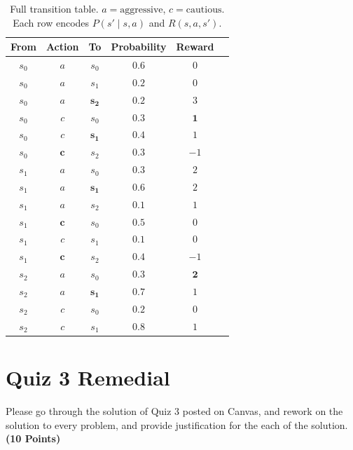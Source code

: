 \documentclass[12pt, xcolor=dvipsnames,svgnames,x11names]{article}
\begin{document}
\begin{enumerate}
\begin{table}[htpb]
\centering
\renewcommand{\arraystretch}{1.3}
\begin{tabular}{cccccc}
\hline
\textbf{From} & \textbf{Action} & \textbf{To} & \textbf{Probability} & \textbf{Reward} \\
\hline
$s_0$ & $a$ & $s_0$ & $0.6$ & $0$  \\
$s_0$ & $a$ & $s_1$ & $0.2$ & $0$  \\
$s_0$ & $a$ & $\boldsymbol{s_2}$ & $0.2$ & $3$  \\
$s_0$ & $c$ & $s_0$ & $0.3$ & $\boldsymbol{1}$  \\
$s_0$ & $c$ & $\boldsymbol{s_1}$   & $0.4$ & $1$  \\
$s_0$ & $\boldsymbol{c}$   & $s_2$ & $0.3$ & $-1$ \\
\hline
$s_1$ & $a$ & $s_0$ & $0.3$ & $2$  \\
$s_1$ & $a$ & $\boldsymbol{s_1}$   & $0.6$ & $2$  \\
$s_1$ & $a$ & $s_2$ & $0.1$ & $1$  \\
$s_1$ & $\boldsymbol{c}$   & $s_0$ & $0.5$ & $0$  \\
$s_1$ & $c$ & $s_1$ & $0.1$ & $0$  \\
$s_1$ & $\boldsymbol{c}$   & $s_2$ & $0.4$ & $-1$ \\
\hline
$s_2$ & $a$ & $s_0$ & $0.3$ & $\boldsymbol{2}$     \\
$s_2$ & $a$ & $\boldsymbol{s_1}$   & $0.7$ & $1$  \\
$s_2$ & $c$ & $s_0$ & $0.2$ & $0$  \\
$s_2$ & $c$ & $s_1$ & $\boldsymbol{0.8}$   & $1$  \\
\hline
\end{tabular}
\caption{Full transition table. $a = \text{aggressive}$, $c = \text{cautious}$.
         Each row encodes $P(s' \mid s, a)$ and $R(s, a, s')$.}
\label{tab:transitions}
\end{table}

\end{enumerate}




%

\section{Quiz 3 Remedial}

Please go through the solution of Quiz 3 posted on Canvas, and rework on the solution to every problem, and provide justification for the each of the solution. \hfill \textbf{(10 Points)}
\end{document}
